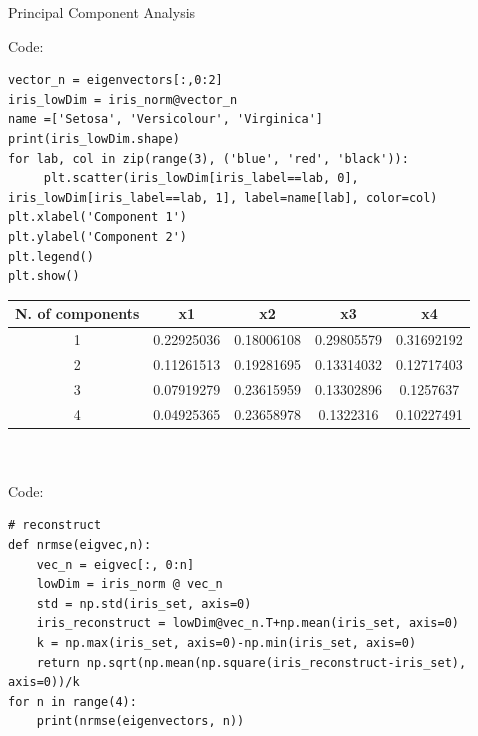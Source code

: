 \documentclass[
	ngerman,
	]{tudaexercise}
\begin{document}
\begin{task}{Principal Component Analysis}
\begin{subtask}
Code:
\begin{lstlisting}
vector_n = eigenvectors[:,0:2]
iris_lowDim = iris_norm@vector_n
name =['Setosa', 'Versicolour', 'Virginica']
print(iris_lowDim.shape)
for lab, col in zip(range(3), ('blue', 'red', 'black')):
     plt.scatter(iris_lowDim[iris_label==lab, 0], iris_lowDim[iris_label==lab, 1], label=name[lab], color=col)
plt.xlabel('Component 1')
plt.ylabel('Component 2')
plt.legend()
plt.show()
\end{lstlisting}

\end{subtask}

\begin{subtask}

\begin{tabular}{|c|c|c|c|c|}
\hline  
N. of components&x1&x2&x3&x4\\
\hline  
1&0.22925036&0.18006108&0.29805579&0.31692192\\
\hline
2&0.11261513&0.19281695&0.13314032&0.12717403\\
\hline
3&0.07919279&0.23615959&0.13302896&0.1257637\\
\hline
4&0.04925365&0.23658978&0.1322316&0.10227491\\
\hline
\end{tabular}
\\
\\Code:
\begin{lstlisting}
# reconstruct
def nrmse(eigvec,n):
    vec_n = eigvec[:, 0:n]
    lowDim = iris_norm @ vec_n
    std = np.std(iris_set, axis=0)
    iris_reconstruct = lowDim@vec_n.T+np.mean(iris_set, axis=0)
    k = np.max(iris_set, axis=0)-np.min(iris_set, axis=0)
    return np.sqrt(np.mean(np.square(iris_reconstruct-iris_set), axis=0))/k
for n in range(4):
    print(nrmse(eigenvectors, n))
\end{lstlisting}
\end{subtask}


\end{task}
\end{document}

